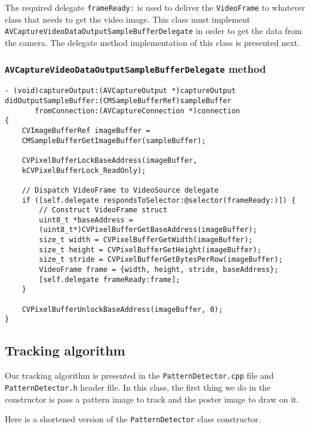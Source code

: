 The required delegate \texttt{frameReady:} is used to deliver the
\texttt{VideoFrame} to whatever class that needs to get the video image. This
class must implement
\texttt{AV\-Capture\-Video\-Data\-Output\-Sample\-Buffer\-Delegate} in order to
get the data from the camera. The delegate method implementation of this class
is presented next.

\subsubsection*{\texttt{AVCaptureVideoDataOutputSampleBufferDelegate} method}
\begin{verbatim}
- (void)captureOutput:(AVCaptureOutput *)captureOutput
didOutputSampleBuffer:(CMSampleBufferRef)sampleBuffer
       fromConnection:(AVCaptureConnection *)connection
{
    CVImageBufferRef imageBuffer = 
    CMSampleBufferGetImageBuffer(sampleBuffer);
    
    CVPixelBufferLockBaseAddress(imageBuffer, 
    kCVPixelBufferLock_ReadOnly);
    
    // Dispatch VideoFrame to VideoSource delegate
    if ([self.delegate respondsToSelector:@selector(frameReady:)]) {
        // Construct VideoFrame struct
        uint8_t *baseAddress =
        (uint8_t*)CVPixelBufferGetBaseAddress(imageBuffer);
        size_t width = CVPixelBufferGetWidth(imageBuffer);
        size_t height = CVPixelBufferGetHeight(imageBuffer);
        size_t stride = CVPixelBufferGetBytesPerRow(imageBuffer);
        VideoFrame frame = {width, height, stride, baseAddress};
        [self.delegate frameReady:frame];
    }

    CVPixelBufferUnlockBaseAddress(imageBuffer, 0);
}
\end{verbatim}

\subsection{Tracking algorithm}
Our tracking algorithm is presented in the \texttt{PatternDetector.cpp} file
and \texttt{PatternDetector.h} header file. In this class, the first thing we
do in the constructor is pass a pattern image to track and the poster image to
draw on it.

Here is a shortened version of the \texttt{PatternDetector} class constructor.

